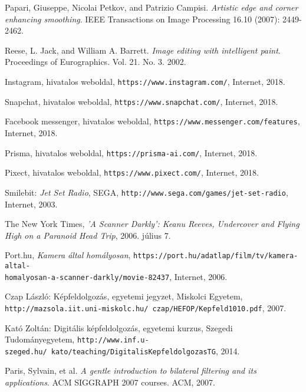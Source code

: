 
\begin{thebibliography}{x}

Papari, Giuseppe, Nicolai Petkov, and Patrizio Campisi. \emph{Artistic edge and corner enhancing smoothing}. IEEE Transactions on Image Processing 16.10 (2007): 2449-2462.

Reese, L. Jack, and William A. Barrett. \emph{Image editing with intelligent paint}. Proceedings of Eurographics. Vol. 21. No. 3. 2002.

Instagram, hivatalos weboldal, \texttt{https://www.instagram.com/}, Internet, 2018.

Snapchat, hivatalos weboldal, \texttt{https://www.snapchat.com/}, Internet, 2018.

Facebook messenger, hivatalos weboldal, \texttt{https://www.messenger.com/features}, Internet, 2018.

Prisma, hivatalos weboldal, \texttt{https://prisma-ai.com/}, Internet, 2018.

Pixect, hivatalos weboldal, \texttt{https://www.pixect.com/}, Internet, 2018.

Smilebit: \emph{Jet Set Radio}, SEGA, \texttt{http://www.sega.com/games/jet-set-radio}, Internet, 2003.

The New York Times, \emph{'A Scanner Darkly': Keanu Reeves, Undercover and Flying High on a Paranoid Head Trip}, 2006. július 7.

Port.hu, \emph{Kamera által homályosan}, \texttt{https://port.hu/adatlap/film/tv/kamera-altal-\\homalyosan-a-scanner-darkly/movie-82437}, Internet, 2006.

Czap László: Képfeldolgozás, egyetemi jegyzet, Miskolci Egyetem, \\ \texttt{http://mazsola.iit.uni-miskolc.hu/~czap/HEFOP/Kepfeld1010.pdf}, 2007.

Kató Zoltán: Digitális képfeldolgozás, egyetemi kurzus, Szegedi Tudományegyetem, \texttt{http://www.inf.u-szeged.hu/~kato/teaching/DigitalisKepfeldolgozasTG}, 2014.

Paris, Sylvain, et al. \emph{A gentle introduction to bilateral filtering and its applications}. ACM SIGGRAPH 2007 courses. ACM, 2007.


\end{thebibliography}
